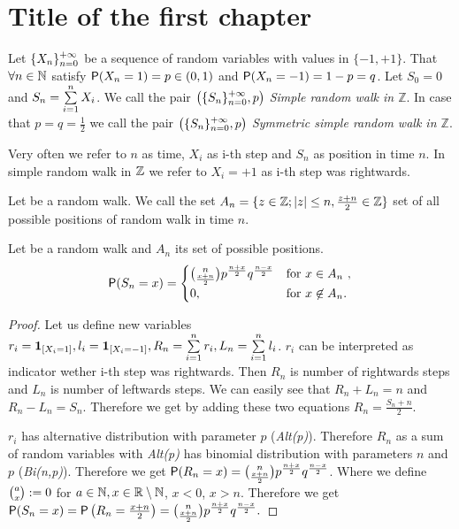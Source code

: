 \chapter{Title of the first chapter}

\begin{defn}\label{def01:1}
  Let $\{X_n\}_{n=0}^{+\infty}$ be a sequence of \iid random variables with values in $\{ -1, +1\}$. That $\forall n \in \mathbb{N}$ satisfy $\operatorname{\textsf{P}}(X_n=1)=p \in (0,1)$ and $\operatorname{\textsf{P}}(X_n=-1)=1-p=q$. Let $S_0=0$ and $S_n=\suma[i][1][n]X_i$. We call the pair $\left(\{S_n\}_{n=0}^{+\infty}, p \right)$ \emph{Simple random walk in $\mathbb{Z}$}. In case that $p=q=\frac{1}{2}$ we call the pair $\left(\{S_n\}_{n=0}^{+\infty}, p \right)$ \emph{Symmetric simple random walk in $\mathbb{Z}$}.
\end{defn}

\begin{rem}
  Very often we refer to $n$ as time, $X_i$ as i-th step and $S_n$ as position in time $n$. In simple random walk in $\mathbb{Z}$ we refer to $X_i=+1$ as i-th step was rightwards.
\end{rem}

\begin{defn}
  Let \rw be a random walk. We call the set $A_n=\{z \in \mathbb{Z}; \left|{z}\right|\leq n, \frac{z+n}{2}\in \mathbb{Z} \}$ set of all possible positions of random walk \rw in time $n$.
\end{defn}

\begin{thm}
  Let \rw be a random walk and $A_n$ its set of possible positions.
  \[
  \operatorname{\textsf{P}}(S_n=x)=
  \begin{cases}
  \binom{n}{\frac{x+n}{2}}p^{\frac{n+x}{2}}q^{\frac{n-x}{2}} & \text{for $x \in A_n$ },\\
  0, & \text{for $x \not\in A_n$}.
  \end{cases}
  \]
\end{thm}
\begin{proof}
  Let us define new variables $r_i=\indikator{X_i=1}, l_i=\indikator{X_i=-1}, R_n=\suma r_i, L_n=\suma l_i$. $r_i$ can be interpreted as indicator wether i-th step was rightwards. Then $R_n$ is number of rightwards steps and $L_n$ is number of leftwards steps. We can easily see that $R_n+L_n=n$ and $R_n-L_n=S_n$. Therefore we get by adding these two equations $R_n=\frac{S_n+n}{2}.$

  $r_i$ has alternative distribution with parameter $p$ (\textit{Alt(p)}). Therefore $R_n$ as a sum of \iid random variables with \textit{Alt(p)} has binomial distribution with parameters $n$ and $p$ (\textit{Bi(n,p)}). Therefore we get $\operatorname{\textsf{P}}(R_n=x)=\binom{n}{\frac{x+n}{2}}p^{\frac{n+x}{2}}q^{\frac{n-x}{2}}$. Where we define $\binom{a}{x}:= 0$ for $a \in \mathbb{N}, x\in \mathbb{R} \setminus \mathbb{N}$, $x<0$, $x>n$. Therefore we get $\operatorname{\textsf{P}}(S_n=x)=\operatorname{\textsf{P}}\left( R_n=\frac{x+n}{2}\right)=  \binom{n}{\frac{x+n}{2}}p^{\frac{n+x}{2}}q^{\frac{n-x}{2}}.$
\end{proof}



